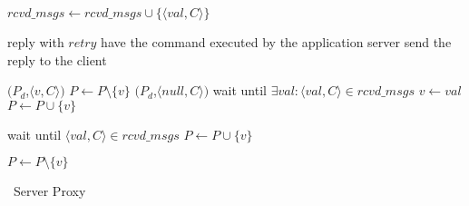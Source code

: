\begin{algorithm}[h!]
\small

\begin{distribalgo}[1]

\vspace{1.0mm}


    \vspace{1.0mm}
    
        \STATE $rcvd\_msgs \leftarrow rcvd\_msgs \cup \{\langle val, C \rangle\}$
    \ENDINDENT

    \vspace{1.0mm}


    \vspace{1.0mm}

                \STATE reply with $retry$
            \ELSE
                \STATE have the command executed by the application server
                \STATE send the reply to the client
            \ENDIF
        

        \vspace{1.0mm}
    
                    \STATE \rmcast$(P_d$,$\langle v, C \rangle)$
                    \STATE $P \leftarrow P \setminus \{v\}$
                \ELSE
                    \STATE \rmcast$(P_d$,$\langle null, C \rangle)$
                \ENDIF
            \ELSE
                \STATE wait until $\exists val : \langle val, C \rangle \in rcvd\_msgs$
                    \STATE $v \leftarrow val$
                    \STATE $P \leftarrow P \cup \{v\}$
                \ENDIF
            \ENDIF
        
        \vspace{1.0mm}
    
            \STATE wait until $\langle val, C \rangle \in rcvd\_msgs$
                \STATE $P \leftarrow P \cup \{v\}$
            \ENDIF
        
        \vspace{1.0mm}
        
                \STATE $P \leftarrow P \setminus \{v\}$
            \ENDIF
        \ENDIF
    \ENDINDENT
\ENDINDENT

\caption{\dssmr\ Server Proxy}
\label{alg:server_proxy}
\end{distribalgo}
\end{algorithm}